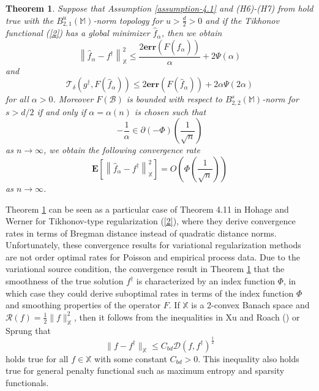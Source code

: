 \documentclass[10pt]{iopart}
\newtheorem{theorem}{Theorem}[section]
\begin{document}
\begin{theorem}\label{Theorem-4.2} 
Suppose that Assumption \ref{assumption-4.1} and (H6)-(H7) from \cite{Hohage2016} hold true with the $B_{2,1}^{u}(\mathbb{M})$-norm topology 
for $u>\frac{d}{2}>0$ and if the Tikhonov functional (\ref{2}) has a global minimizer $\widehat{f}_{\alpha}$, then we obtain
\begin{equation}\label{30}
\left\|\widehat{f}_{\alpha}-f^{\dagger}\right\|_{\mathbb{X}}^{2}\leq \frac{2\mathbf{err}(F(\widehat{f}_{\alpha}))}{\alpha}
+2\Psi\left(\alpha\right)
\end{equation}
and
\begin{equation}\label{31}
\mathcal{T}_{\delta}(g^{\dagger}, F(\widehat{f}_{\alpha}))\leq 2\mathbf{err}(F(\widehat{f}_{\alpha}))+2\alpha\Psi(2\alpha) 
\end{equation}
for all $\alpha>0$. Moreover $F(\mathcal{B})$ is bounded with respect to $B_{2, 2}^{s}(\mathbb{M})$-norm for $s>d/2$
if and only if $\alpha=\alpha(n)$ is chosen such that
\begin{equation*}
-\frac{1}{\alpha}\in \partial (-\Phi)\left(\frac{1}{\sqrt{n}}\right)
\end{equation*}
as $n\rightarrow\infty$, we obtain the following convergence rate
\begin{equation}\label{32}
\mathbf{E}\left[\left\|\widehat{f}_{\alpha}-f^{\dagger}\right\|_{\mathbb{X}}^{2}\right]
=O\left(\Phi\left(\frac{1}{\sqrt{n}}\right)\right)
\end{equation}
as $n\rightarrow\infty$. 
\end{theorem}

Theorem \ref{Theorem-4.2} can be seen as a particular case of Theorem 4.11 in Hohage and Werner \cite{Hohage2016}
for Tikhonov-type regularization (\ref{2}), where they derive convergence rates in terms of Bregman distance instead of quadratic 
distance norms. Unfortunately, these convergence results for variational regularization methods are not order optimal rates for Poisson and 
empirical process data. Due to the variational source condition, the convergence result in Theorem \ref{Theorem-4.2} that the smoothness of the 
true solution $f^{\dagger}$ is characterized by an index function $\Phi$, in which case they could derive suboptimal rates in terms of the index
function $\Phi$ and smoothing properties of the operator $F$. If $\mathbb{X}$ is a 2-convex Banach space and 
$\mathcal{R}(f)=\frac{1}{2}\|f\|_{\mathbb{X}}^{2}$, then it follows from the inequalities in Xu and Roach (\cite{Xu1991}) or 
Sprung \cite{Sprung2019} that
\begin{equation*}
\|f-f^{\dagger}\|_{\mathbb{X}}\leq C_{bd}\mathcal{D}(f, f^{\dagger})^{\frac{1}{2}}
\end{equation*}
holds true for all $f\in\mathbb{X}$ with some constant $C_{bd}>0$. This inequality also holds true for general penalty functional such as 
maximum entropy and sparsity functionals. 
\end{document}
